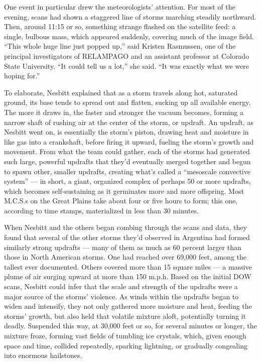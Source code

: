 One event in particular drew the meteorologists' attention. For most of
the evening, scans had shown a staggered line of storms marching
steadily northward. Then, around 11:15 or so, something strange flashed
on the satellite feed: a single, bulbous mass, which appeared suddenly,
covering much of the image field. ``This whole huge line just popped
up,'' said Kristen Rasmussen, one of the principal investigators of
RELAMPAGO and an assistant professor at Colorado State University. ``It
could tell us a lot,'' she said. ``It was exactly what we were hoping
for.''

To elaborate, Nesbitt explained that as a storm travels along hot,
saturated ground, its base tends to spread out and flatten, sucking up
all available energy. The more it draws in, the faster and stronger the
vacuum becomes, forming a narrow shaft of rushing air at the center of
the storm, or updraft. An updraft, as Nesbitt went on, is essentially
the storm's piston, drawing heat and moisture in like gas into a
crankshaft, before firing it upward, fueling the storm's growth and
movement. From what the team could gather, each of the storms had
generated such large, powerful updrafts that they'd eventually merged
together and begun to spawn other, smaller updrafts, creating what's
called a ``mesoscale convective system'' --- in short, a giant,
organized complex of perhaps 50 or more updrafts, which becomes
self-sustaining as it germinates more and more offspring. Most M.C.S.s
on the Great Plains take about four or five hours to form; this one,
according to time stamps, materialized in less than 30 minutes.

When Nesbitt and the others began combing through the scans and data,
they found that several of the other storms they'd observed in Argentina
had formed similarly strong updrafts --- many of them as much as 60
percent larger than those in North American storms. One had reached over
69,000 feet, among the tallest ever documented. Others covered more than
15 square miles --- a massive plume of air surging upward at more than
150 m.p.h. Based on the initial DOW scans, Nesbitt could infer that the
scale and strength of the updrafts were a major source of the storms'
violence. As winds within the updrafts began to widen and intensify,
they not only gathered more moisture and heat, feeding the storms'
growth, but also held that volatile mixture aloft, potentially turning
it deadly. Suspended this way, at 30,000 feet or so, for several minutes
or longer, the mixture froze, forming vast fields of tumbling ice
crystals, which, given enough space and time, collided repeatedly,
sparking lightning, or gradually congealing into enormous hailstones.

